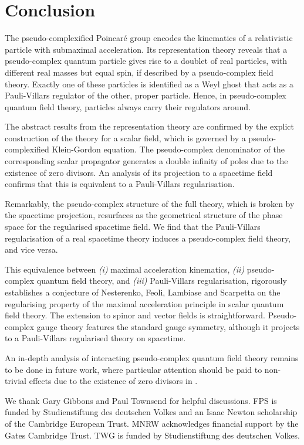 \documentclass[a4paper,aps,prd,showkeys,showpacs,superscriptaddress,preprint]{revtex4}
\providecommand{\pc}{\mathbb{P}}
\begin{document}
\section{Conclusion\label{sec_conclusion}}
The pseudo-complexified Poincar\'e group encodes the kinematics of a
relativistic particle with submaximal acceleration. Its representation
theory reveals that a pseudo-complex quantum particle gives rise to a doublet
of real particles, with different real masses but equal spin, if
described by a pseudo-complex field theory. Exactly one of these
particles is identified as a Weyl ghost that acts as a
Pauli-Villars regulator of the other, proper particle. Hence, in
pseudo-complex quantum field theory, particles always carry their
regulators around.

The abstract results from the representation theory are confirmed by
the explict construction of the theory for a scalar field, which is
governed by a pseudo-complexified Klein-Gordon equation. 
The pseudo-complex denominator of the
corresponding scalar propagator generates a double infinity of poles
due to the existence of zero divisors. An analysis of its
projection to a spacetime field confirms that this is equivalent to a
Pauli-Villars regularisation. 

Remarkably, the pseudo-complex structure of the full
theory, which is broken by the spacetime projection, resurfaces as the
geometrical structure of the phase space for the regularised spacetime
field.  
We find that the Pauli-Villars regularisation of a real
spacetime theory induces a pseudo-complex field theory, and vice versa. 

This equivalence between \textsl{(i)} maximal acceleration kinematics, 
\textsl{(ii)} pseudo-complex quantum field theory, and \textsl{(iii)} 
Pauli-Villars regularisation,
rigorously establishes a conjecture of Nesterenko, Feoli,
Lambiase and Scarpetta \cite{Nesterenko:1998jt} on the regularising
property of the maximal acceleration principle in scalar quantum field
theory.
The extension to spinor and vector fields is straightforward. 
Pseudo-complex gauge theory features the standard gauge symmetry, 
although it projects to a Pauli-Villars regularised theory on spacetime.

An in-depth analysis of interacting pseudo-complex quantum field
theory remains to be done in future work, where particular attention should
be paid to non-trivial effects due to the existence of zero divisors
in \myHighlight{$\pc$}\coordHE{}.


\begin{acknowledgments}
  We thank Gary Gibbons and Paul Townsend for helpful discussions. 
  FPS is funded by Studienstiftung des deutschen Volkes and an Isaac Newton
  scholarship of the Cambridge European Trust. MNRW acknowledges
  financial support by the Gates Cambridge Trust. TWG is funded by
  Studienstiftung des deutschen Volkes.  
\end{acknowledgments}
\end{document}
